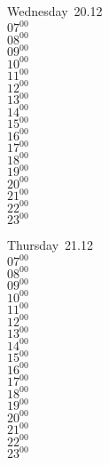 \documentclass[11pt, a4paper]{book}\usepackage[]{graphicx}\usepackage[]{color}
\begin{document}
\begin{weekdaybox}
  Wednesday~20.12\\
  { 
  \vfill
  $07^{00}$\\
$08^{00}$\\
$09^{00}$\\
$10^{00}$\\
$11^{00}$\\
$12^{00}$\\
$13^{00}$\\
$14^{00}$\\
$15^{00}$\\
$16^{00}$\\
$17^{00}$\\
$18^{00}$\\
$19^{00}$\\
$20^{00}$\\
$21^{00}$\\
$22^{00}$\\
$23^{00}$\\
  }
\end{weekdaybox}
\clearpage
\begin{headerbox}
\end{headerbox}
\begin{weekdaybox}
  Thursday~21.12\\
  { 
  \vfill
  $07^{00}$\\
$08^{00}$\\
$09^{00}$\\
$10^{00}$\\
$11^{00}$\\
$12^{00}$\\
$13^{00}$\\
$14^{00}$\\
$15^{00}$\\
$16^{00}$\\
$17^{00}$\\
$18^{00}$\\
$19^{00}$\\
$20^{00}$\\
$21^{00}$\\
$22^{00}$\\
$23^{00}$\\
  }
\end{weekdaybox} 
\end{document}
